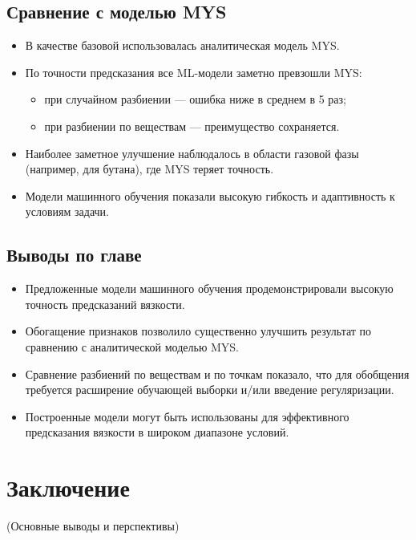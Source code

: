 \documentclass[a4paper,12pt]{article}
\begin{document}
  \subsection{Сравнение с моделью MYS}

    \begin{itemize}
      \item В качестве базовой использовалась аналитическая модель MYS.
      \item По точности предсказания все ML-модели заметно превзошли MYS:
      \begin{itemize}
        \item при случайном разбиении --- ошибка ниже в среднем в 5 раз;
        \item при разбиении по веществам — преимущество сохраняется.
      \end{itemize}
      \item Наиболее заметное улучшение наблюдалось в области газовой фазы (например, для бутана), где MYS теряет точность.
      \item Модели машинного обучения показали высокую гибкость и адаптивность к условиям задачи.
    \end{itemize}

  \subsection{Выводы по главе}
  
    \begin{itemize}
      \item Предложенные модели машинного обучения продемонстрировали высокую точность предсказаний вязкости.
      \item Обогащение признаков позволило существенно улучшить результат по сравнению с аналитической моделью MYS.
      \item Сравнение разбиений по веществам и по точкам показало, что для обобщения требуется расширение обучающей выборки и/или введение регуляризации.
      \item Построенные модели могут быть использованы для эффективного предсказания вязкости в широком диапазоне условий.
    \end{itemize}
\section*{Заключение}
(Основные выводы и перспективы)
\newpage
\end{document}

